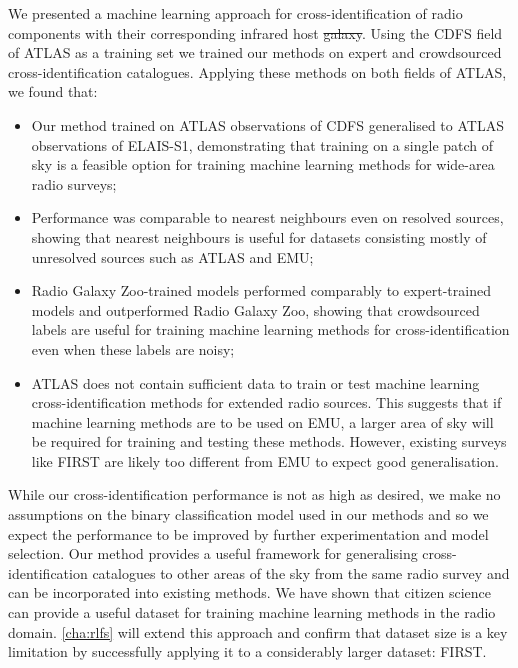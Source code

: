 \documentclass[11pt, a4paper]{book}
\providecommand{\DIFaddtex}[1]{{\protect\color{blue}\uwave{#1}}} %
\providecommand{\DIFdeltex}[1]{{\protect\color{red}\sout{#1}}}                      %
\providecommand{\DIFaddbegin}{} %
\providecommand{\DIFaddend}{} %
\providecommand{\DIFdelbegin}{} %
\providecommand{\DIFdelend}{} %
\providecommand{\DIFadd}[1]{\texorpdfstring{\DIFaddtex{#1}}{#1}} %
\providecommand{\DIFdel}[1]{\texorpdfstring{\DIFdeltex{#1}}{}} %
\newcommand{\DIFscaledelfig}{0.5}
\newlength{\DIFdelgraphicswidth} %
\newlength{\DIFdelgraphicsheight} %
\newcommand{\DIFaddincludegraphics}[2][]{{\color{blue}\fbox{\DIFOincludegraphics[#1]{#2}}}} %
\newcommand{\DIFdelincludegraphics}[2][]{%
\sbox{\DIFdelgraphicsbox}{\DIFOincludegraphics[#1]{#2}}%
\settoboxwidth{\DIFdelgraphicswidth}{\DIFdelgraphicsbox} %
\settoboxtotalheight{\DIFdelgraphicsheight}{\DIFdelgraphicsbox} %
\scalebox{\DIFscaledelfig}{%
\parbox[b]{\DIFdelgraphicswidth}{\usebox{\DIFdelgraphicsbox}\\[-\baselineskip] \rule{\DIFdelgraphicswidth}{0em}}\llap{\resizebox{\DIFdelgraphicswidth}{\DIFdelgraphicsheight}{%
\setlength{\unitlength}{\DIFdelgraphicswidth}%
\begin{picture}(1,1)%
\thicklines\linethickness{2pt} %
{\color[rgb]{1,0,0}\put(0,0){\framebox(1,1){}}}%
{\color[rgb]{1,0,0}\put(0,0){\line( 1,1){1}}}%
{\color[rgb]{1,0,0}\put(0,1){\line(1,-1){1}}}%
\end{picture}%
}\hspace*{3pt}}} %
} %
\DeclareRobustCommand{\DIFaddbegin}{\DIFOaddbegin \let\includegraphics\DIFaddincludegraphics} %
\DeclareRobustCommand{\DIFaddend}{\DIFOaddend \let\includegraphics\DIFOincludegraphics} %
\DeclareRobustCommand{\DIFdelbegin}{\DIFOdelbegin \let\includegraphics\DIFdelincludegraphics} %
\DeclareRobustCommand{\DIFdelend}{\DIFOaddend \let\includegraphics\DIFOincludegraphics} %
\begin{document}
  We presented a machine learning approach for cross-identification of radio
  components with their corresponding infrared host \DIFdelbegin \DIFdel{galaxy}\DIFdelend \DIFaddbegin \DIFadd{galaxies}\DIFaddend . Using the CDFS
  field of ATLAS as a training set we trained our
  methods on expert and crowdsourced cross-identification catalogues.
  Applying these methods on both fields of ATLAS, we found that:
  \begin{itemize}
    \item Our method trained on ATLAS observations of CDFS generalised to
    ATLAS observations of ELAIS-S1, demonstrating that training on a single
    patch of sky is a feasible option for training machine learning methods
    for wide-area radio surveys;
    \item Performance was comparable to nearest neighbours even on resolved
    sources, showing that nearest neighbours is useful for datasets consisting
    mostly of unresolved sources such as ATLAS and EMU;
    \item Radio Galaxy Zoo-trained models performed comparably to
    expert-trained models and outperformed Radio Galaxy Zoo, showing that
    crowdsourced labels are useful for training machine learning methods for
    cross-identification even when these labels are noisy;
    \item ATLAS does not contain sufficient data to train or test machine
    learning cross-identification methods for extended radio sources. This
    suggests that if machine learning methods are to be used on EMU, a larger
    area of sky will be required for training and testing these methods.
    However, existing surveys like FIRST are likely too different from EMU to expect
    good generalisation.
  \end{itemize}

  While our cross-identification performance is not as high as desired, we
  make no assumptions on the binary classification model used in our methods
  and so we expect the performance to be improved by further experimentation
  and model selection. Our method provides a useful framework for generalising
  cross-identification catalogues to other areas of the sky from the same
  radio survey and can be incorporated into existing methods. {We have
  shown that citizen science can provide a useful dataset for training machine
  learning methods in the radio domain.} \autoref{cha:rlfs} will extend this
  approach and confirm that dataset size is a key limitation by successfully applying it to a considerably larger dataset: FIRST.
\end{document}
